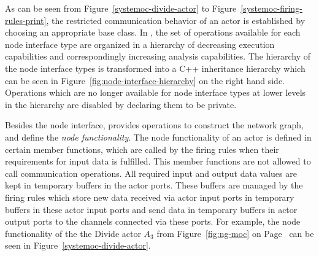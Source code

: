 As can be seen from Figure~\ref{systemoc-divide-actor} to Figure~\ref{systemoc-firing-rules-print},
the restricted communication behavior of an actor is established by choosing
an appropriate base class.
In \SysteMoC{}, the set of operations available for each node interface type
are organized in a hierarchy of decreasing execution capabilities and
correspondingly increasing analysis capabilities.
The hierarchy of the node interface types is transformed into
a C++ inheritance hierarchy which can be seen in Figure~\ref{fig:node-interface-hierarchy}
on the right hand side.
Operations which are no longer available for node interface types
at lower levels in the hierarchy are disabled by declaring them to be private.

Besides the node interface, \SysteMoC{} provides operations to construct the
network graph, and define the \emph{node functionality}.
The node functionality of an actor is defined in certain member functions,
which are called by the firing rules when their requirements for input data
is fulfilled. This member functions are not allowed to call communication
operations. All required input and output data values are kept in temporary buffers
in the actor ports. These buffers are managed by the firing rules which store
new data received via actor input ports in temporary buffers in these
actor input ports and send data in temporary buffers in actor output ports
to the channels connected via these ports. For example, the node functionality
of the the Divide actor $A_3$ from Figure~\ref{fig:ng-moc} on Page~\pageref{fig:ng-moc}
can be seen in Figure~\ref{systemoc-divide-actor}.

